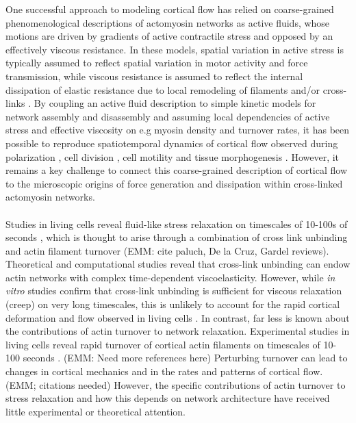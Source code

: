 \documentclass[10pt,letterpaper]{article}
\begin{document}
One successful approach to modeling cortical flow has relied on coarse-grained phenomenological descriptions of actomyosin networks as active fluids, whose motions are driven by gradients of active contractile stress and opposed by an effectively viscous resistance\cite{cellmech_flows}.  In these models, spatial variation in active stress is typically assumed to reflect spatial variation in motor activity and force transmission, while viscous resistance is assumed to reflect the internal dissipation of elastic resistance due to local remodeling of filaments and/or cross-links \cite{PhysRevLett.106.028103}. By coupling an active fluid description to simple kinetic models for network assembly and disassembly and assuming local dependencies of active stress and effective viscosity on e.g myosin density and turnover rates, it has been possible to reproduce spatiotemporal dynamics of cortical flow observed during polarization \cite{cellmech_flows}, cell division \cite{Turlier2014114,PhysRevLett.103.058102}, cell motility \cite{Keren:2009aa,RevModPhys.85.1143} and tissue morphogenesis \cite{Heisenberg2013948}. However, it remains a key challenge to connect this coarse-grained description of cortical flow to the microscopic origins of force generation and dissipation within cross-linked actomyosin networks.  

\paragraph{} Studies in living cells reveal fluid-like stress relaxation on timescales of 10-100s of seconds \cite{cellmech_flows,cellmech_flows2,cellmech_flows3,rheo_fluid,rheo_fluid2,cell_rheo_exp}, which is thought to arise through a combination of cross link unbinding and actin filament turnover (EMM: cite paluch, De la Cruz, Gardel reviews).  Theoretical \cite{theo_crosslinkslip1,theo_crosslinkslip2} and computational \cite{model_taeyoon,rheo_crosslinkslip2,theo_crosslinkslip3} studies reveal that cross-link unbinding can endow actin networks with complex time-dependent viscoelasticity. However, while {\em in vitro} studies confirm that cross-link unbinding is sufficient for viscous relaxation (creep) on very long timescales, this is unlikely to account for the rapid cortical deformation and flow observed in living cells \cite{rheo_crosslinksmatter,rheo_crosslinkslip1,rheo_crosslinkslip2,rheo_crosslinkslip3,rheo_nonaffine}.  In contrast, far less is known about the contributions of actin turnover to network relaxation. Experimental studies in living cells reveal rapid turnover of cortical actin filaments on timescales of 10-100 seconds \cite{Robin:2014aa}.  (EMM: Need more references here) Perturbing turnover can lead to changes in cortical mechanics and in the rates and patterns of cortical flow.  (EMM; citations needed) However, the specific contributions of actin turnover to stress relaxation and how this depends on network architecture have received little experimental or theoretical attention.   
\end{document}
